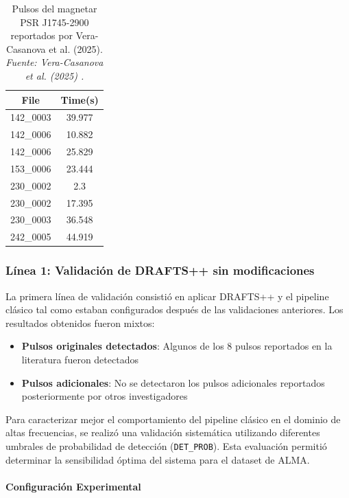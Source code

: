 \begin{table}[H]
    \centering
    \caption{Pulsos del magnetar PSR J1745-2900 reportados por Vera-Casanova et al. (2025). \textit{Fuente: Vera-Casanova et al. (2025) \cite{veracasanova2025}.}}
    \label{tab:veracasanova_reference}
    \begin{tabular}{|c|c|}
        \hline
        \textbf{File} & \textbf{Time(s)} \\
        \hline
        142\_0003 & 39.977 \\
        142\_0006 & 10.882 \\
        142\_0006 & 25.829 \\
        153\_0006 & 23.444 \\
        230\_0002 & 2.3 \\
        230\_0002 & 17.395 \\
        230\_0003 & 36.548 \\
        242\_0005 & 44.919 \\
        \hline
    \end{tabular}
\end{table}

\subsubsection{Línea 1: Validación de DRAFTS++ sin modificaciones}

La primera línea de validación consistió en aplicar DRAFTS++ y el pipeline clásico tal como estaban configurados después de las validaciones anteriores. Los resultados obtenidos fueron mixtos:

\begin{itemize}
    \item \textbf{Pulsos originales detectados}: Algunos de los 8 pulsos reportados en la literatura fueron detectados
    \item \textbf{Pulsos adicionales}: No se detectaron los pulsos adicionales reportados posteriormente por otros investigadores
\end{itemize}

Para caracterizar mejor el comportamiento del pipeline clásico en el dominio de altas frecuencias, se realizó una validación sistemática utilizando diferentes umbrales de probabilidad de detección (\texttt{DET\_PROB}). Esta evaluación permitió determinar la sensibilidad óptima del sistema para el dataset de ALMA.

\paragraph{Configuración Experimental}

